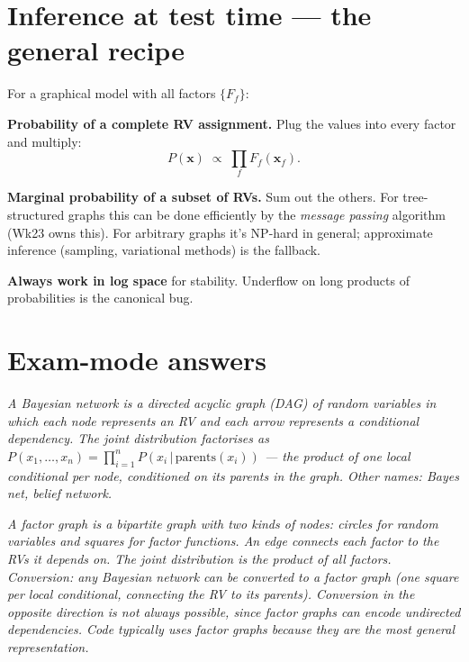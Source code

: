 \documentclass[11pt, a4paper]{article}
\begin{document}
\section{Inference at test time --- the general recipe}

For a graphical model with all factors $\{F_f\}$:

\textbf{Probability of a complete RV assignment.} Plug the values into every factor and multiply:
\[
P(\mathbf{x}) \;\propto\; \prod_f F_f(\mathbf{x}_f).
\]

\textbf{Marginal probability of a subset of RVs.} Sum out the others. For tree-structured graphs this can be done efficiently by the \emph{message passing} algorithm (Wk23 owns this). For arbitrary graphs it's NP-hard in general; approximate inference (sampling, variational methods) is the fallback.

\textbf{Always work in log space} for stability. Underflow on long products of probabilities is the canonical bug.

\section{Exam-mode answers}

\begin{exambox}
\textit{A Bayesian network is a directed acyclic graph (DAG) of random variables in which each node represents an RV and each arrow represents a conditional dependency. The joint distribution factorises as $P(x_1, \ldots, x_n) = \prod_{i=1}^n P(x_i\,|\,\text{parents}(x_i))$ — the product of one local conditional per node, conditioned on its parents in the graph. Other names: Bayes net, belief network.}
\end{exambox}

\begin{exambox}
\textit{A factor graph is a bipartite graph with two kinds of nodes: circles for random variables and squares for factor functions. An edge connects each factor to the RVs it depends on. The joint distribution is the product of all factors. Conversion: any Bayesian network can be converted to a factor graph (one square per local conditional, connecting the RV to its parents). Conversion in the opposite direction is not always possible, since factor graphs can encode undirected dependencies. Code typically uses factor graphs because they are the most general representation.}
\end{exambox}
\end{document}

